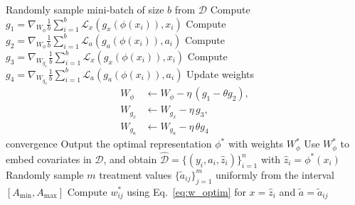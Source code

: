\documentclass[sigconf]{acmart}
\newcommand{\framework}{\textbf{\mbox{CG-CT}}\xspace}
\begin{document}
\begin{algorithm}[htbp]
\caption{Learning algorithm for \framework}
\label{alg:CG-CT}

\vspace{0.25cm}
\begin{algorithmic}[1]
\scriptsize
{}
\vspace{0.3cm}
\Repeat  {}
\State Randomly sample mini-batch of size $b$ from  $\mathcal{D}$
\State \mbox{Compute $g_1 = \nabla_{W_{\phi}}  \frac{1}{b} \sum \limits_{i=1}^b \mathcal{L}_x(g_x(\phi(x_i)),x_i) $}
\State \mbox{Compute $g_2 = \nabla_{W_{\phi}}  \frac{1}{b} \sum \limits_{i=1}^b \mathcal{L}_a(g_a(\phi(x_i)),a_i) $}
\State \mbox{Compute $g_3 = \nabla_{W_{g_x}}  \frac{1}{b} \sum \limits_{i=1}^b \mathcal{L}_x(g_x(\phi(x_i)),x_i) $}
\State \mbox{Compute $g_4 = \nabla_{W_{g_a}}  \frac{1}{b} \sum \limits_{i=1}^b \mathcal{L}_a(g_a(\phi(x_i)),a_i) $}
\State Update weights 
\vspace{-0.2cm}
\begin{align*}
W_{\phi} &\leftarrow W_{\phi} - \eta \, (g_1 - \theta g_2) , \\
W_{g_x} &\leftarrow W_{g_x} - \eta \, g_3 , \\
W_{g_a} &\leftarrow W_{g_a} - \eta \, \theta g_4 
\end{align*}
\vspace{-0.3cm}
\Until convergence
\State Output the optimal representation $\phi^*$ with weights $W_{\phi}^*$
\State Use $W_{\phi}^*$ to embed covariates in $\mathcal{D}$, and obtain $\hat{\mathcal{D}} =  \{(y_i, a_i, \hat{z}_i)\}_{i=1}^{n}$ with $\hat{z}_i = \phi^*(x_i)$
\vspace{0.3cm}
 
    \State Randomly sample $m$ treatment values $\{ \tilde{a}_{ij} \}_{j=1}^m$ uniformly from the interval $[A_{\mathrm{min}}, A_{\mathrm{max}}]$
        \State Compute $w_{ij}^*$ using Eq.~\eqref{eq:w_optim} for $x = \hat{z}_i$ and $\tilde{a} = \tilde{a}_{ij}$

\end{algorithmic}
\end{algorithm}
\end{document}
